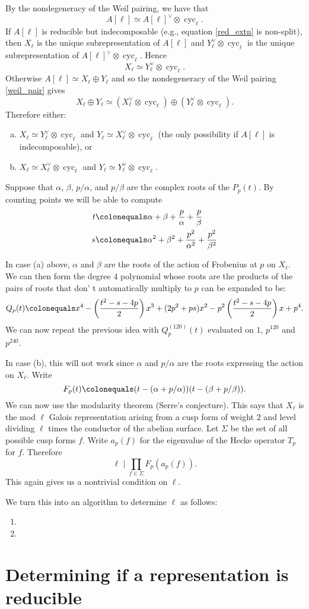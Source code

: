 \documentclass[11pt]{amsart}
\newcommand{\cyc}{\operatorname{cyc}}
\theoremstyle{definition}
\theoremstyle{remark}
\begin{document}
By the nondegeneracy of the Weil pairing, we have that
\begin{equation}\label{weil_pair}A[\ell] \simeq A[\ell]^\vee \otimes \cyc_\ell.\end{equation}
If $A[\ell]$ is reducible but indecomposable (e.g., equation \eqref{red_extn} is non-split), then $X_{\ell}$ is the unique subrepresentation of $A[\ell]$ and $Y_\ell^\vee \otimes \cyc_{\ell}$ is the unique subrepresentation of $A[\ell]^\vee \otimes \cyc_\ell$.  Hence
\[ X_\ell \simeq Y_\ell^\vee \otimes \cyc_\ell.\]
Otherwise $A[\ell] \simeq X_\ell \oplus Y_\ell$ and so the nondegeneracy of the Weil pairing \eqref{weil_pair} gives
\[X_\ell \oplus Y_\ell \simeq \left(X_\ell^\vee \otimes \cyc_\ell\right) \oplus \left(Y_\ell^\vee \otimes \cyc_\ell\right).\]
Therefore either:
\begin{enumerate}[(a)]
\item $X_\ell \simeq Y_\ell^\vee \otimes \cyc_\ell$ and $Y_\ell\simeq X_\ell^\vee \otimes \cyc_\ell$ (the only possibility if $A[\ell]$ is indecomposable), or 
\item $X_\ell \simeq X_\ell^\vee \otimes \cyc_\ell$ and $Y_\ell \simeq Y_\ell^\vee \otimes \cyc_\ell$.
\end{enumerate}

Suppose that $\alpha$, $\beta$, $p/\alpha$, and $p/\beta$ are the complex roots of the $P_p(t)$.  By counting points we will be able to compute
\begin{align*}
t &\colonequals \alpha + \beta + \frac{p}{\alpha} + \frac{p}{\beta} \\
s &\colonequals \alpha^2 + \beta^2 + \frac{p^2}{\alpha^2} + \frac{p^2}{\beta^2} 
\end{align*}

In case (a) above, $\alpha$ and $\beta$ are the roots of the action of Frobenius at $p$ on $X_\ell$.  We can then form the degree $4$ polynomial whose roots are the products of the pairs of roots that don'
t automatically multiply to $p$ can be expanded to be:
\[Q_p(t) \colonequals x^4 - \left( \frac{t^2 - s - 4p}{2} \right) x^3 + (2p^2 + ps)x^2 - p^2\left( \frac{t^2 - s - 4p}{2} \right)x + p^4.\]
We can now repeat the previous idea with $Q_p^{(120)}(t)$ evaluated on $1$, $p^{120}$ and $p^{240}$.

In case (b), this will not work since $\alpha$ and $p/\alpha$ are the roots expressing the action on $X_\ell$.  Write 
\[F_p(t) \colonequals (t - (\alpha + p/\alpha))(t - (\beta + p/\beta)).\]
We can now use the modularity theorem (Serre's conjecture).  This says that $X_\ell$ is the mod $\ell$ Galois representation arising from a cusp form of weight $2$ and level dividing $\ell$ times the conductor of the abelian surface.  Let $\Sigma$ be the set of all possible cusp forms $f$.  Write $a_p(f)$ for the eigenvalue of the Hecke operator $T_p$ for $f$.  Therefore
\[\ell \mid \prod_{f \in \Sigma} F_p(a_p(f)).\]
This again gives us a nontrivial condition on $\ell$.

We turn this into an algorithm to determine $\ell$ as follows:
\begin{enumerate}
\item
\item
\end{enumerate}


\section{Determining if a representation is reducible}\label{test_ell}
\end{document}
